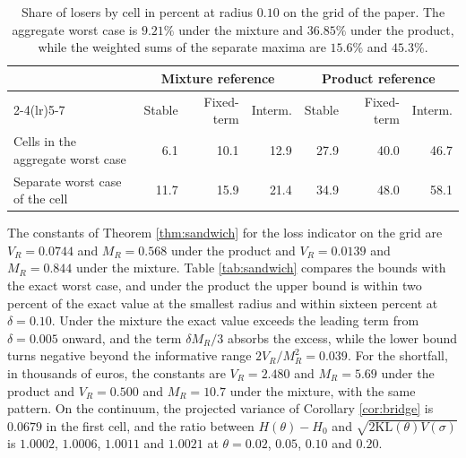 \documentclass[11pt,a4paper]{article}
\theoremstyle{notesplain}
\theoremstyle{notesupright}
\numberwithin{equation}{section}
\newcommand{\KL}{\mathrm{KL}}
\begin{document}
\begin{table}[h]
\centering\small
\setlength{\tabcolsep}{4pt}\begin{tabular}{lrrrrrr}
\toprule
& \multicolumn{3}{c}{Mixture reference} & \multicolumn{3}{c}{Product reference}\\
\cmidrule(lr){2-4}\cmidrule(lr){5-7}
& Stable & Fixed-term & Interm. & Stable & Fixed-term & Interm.\\
\midrule
Cells in the aggregate worst case & 6.1 & 10.1 & 12.9 & 27.9 & 40.0 & 46.7\\
Separate worst case of the cell & 11.7 & 15.9 & 21.4 & 34.9 & 48.0 & 58.1\\
\bottomrule
\end{tabular}
\caption{Share of losers by cell in percent at radius $0.10$ on the grid of the paper. The aggregate worst case is $9.21\%$ under the mixture and $36.85\%$ under the product, while the weighted sums of the separate maxima are $15.6\%$ and $45.3\%$.}
\label{tab:incidence}
\end{table}

The constants of Theorem \ref{thm:sandwich} for the loss indicator on the grid are $V_R=0.0744$ and $M_R=0.568$ under the product and $V_R=0.0139$ and $M_R=0.844$ under the mixture. Table \ref{tab:sandwich} compares the bounds with the exact worst case, and under the product the upper bound is within two percent of the exact value at the smallest radius and within sixteen percent at $\delta=0.10$. Under the mixture the exact value exceeds the leading term from $\delta=0.005$ onward, and the term $\delta M_R/3$ absorbs the excess, while the lower bound turns negative beyond the informative range $2V_R/M_R^2=0.039$. For the shortfall, in thousands of euros, the constants are $V_R=2.480$ and $M_R=5.69$ under the product and $V_R=0.500$ and $M_R=10.7$ under the mixture, with the same pattern. On the continuum, the projected variance of Corollary \ref{cor:bridge} is $0.0679$ in the first cell, and the ratio between $H(\theta)-H_0$ and $\sqrt{2\KL(\theta)V(\sigma)}$ is $1.0002$, $1.0006$, $1.0011$ and $1.0021$ at $\theta=0.02$, $0.05$, $0.10$ and $0.20$.
\end{document}
